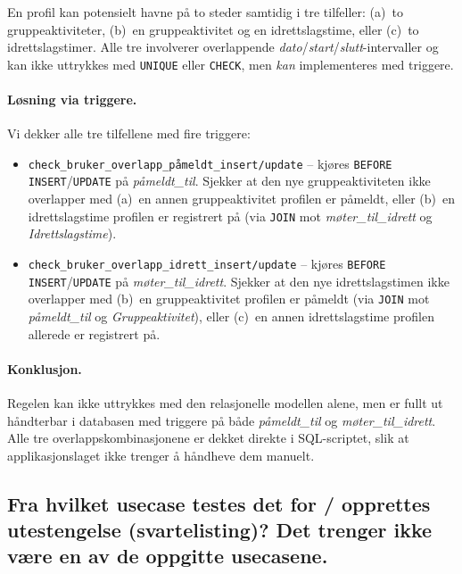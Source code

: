 En profil kan potensielt havne på to steder samtidig i tre tilfeller:
(a)~to gruppeaktiviteter, (b)~en gruppeaktivitet og en idrettslagstime,
eller (c)~to idrettslagstimer. Alle tre involverer overlappende
\textit{dato}/\textit{start}/\textit{slutt}-intervaller og kan ikke
uttrykkes med \texttt{UNIQUE} eller \texttt{CHECK},
men \emph{kan} implementeres med triggere.

\paragraph{Løsning via triggere.}
Vi dekker alle tre tilfellene med fire triggere:
\begin{itemize}
    \item \texttt{check\_bruker\_overlapp\_påmeldt\_insert/update} –
          kjøres \texttt{BEFORE INSERT}/\texttt{UPDATE} på \textit{påmeldt\_til}.
          Sjekker at den nye gruppeaktiviteten ikke overlapper med
          (a)~en annen gruppeaktivitet profilen er påmeldt,
          eller (b)~en idrettslagstime profilen er registrert på
          (via \texttt{JOIN} mot \textit{møter\_til\_idrett} og \textit{Idrettslagstime}).
    \item \texttt{check\_bruker\_overlapp\_idrett\_insert/update} –
          kjøres \texttt{BEFORE INSERT}/\texttt{UPDATE} på \textit{møter\_til\_idrett}.
          Sjekker at den nye idrettslagstimen ikke overlapper med
          (b)~en gruppeaktivitet profilen er påmeldt
          (via \texttt{JOIN} mot \textit{påmeldt\_til} og \textit{Gruppeaktivitet}),
          eller (c)~en annen idrettslagstime profilen allerede er registrert på.
\end{itemize}

\paragraph{Konklusjon.}
Regelen kan ikke uttrykkes med den relasjonelle modellen alene,
men er fullt ut håndterbar i databasen med triggere på både
\textit{påmeldt\_til} og \textit{møter\_til\_idrett}.
Alle tre overlappskombinasjonene er dekket direkte i SQL-scriptet,
slik at applikasjonslaget ikke trenger å håndheve dem manuelt.

\subsection{Fra hvilket usecase testes det for / opprettes utestengelse (svartelisting)? Det
trenger ikke være en av de oppgitte usecasene.}

